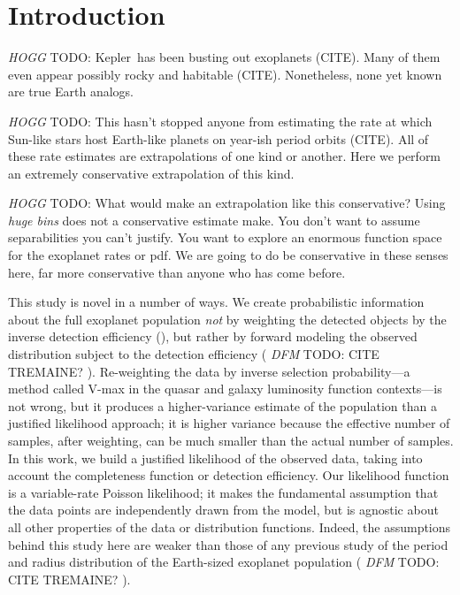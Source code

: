 \documentclass[12pt,preprint]{aastex}
\newcommand{\project}[1]{{\sffamily #1}}
\newcommand{\kepler}{\project{Kepler}}
\newcommand{\todo}[3]{{\color{#2} \emph{#1} TODO: #3}}
\newcommand{\dfmtodo}[1]{\todo{DFM}{red}{#1}}
\newcommand{\hoggtodo}[1]{\todo{HOGG}{blue}{#1}}
\begin{document}

\section{Introduction}

\hoggtodo{%
\kepler\ has been busting out exoplanets (CITE).
Many of them even appear possibly rocky and habitable (CITE).
Nonetheless, none yet known are true Earth analogs.
}

\hoggtodo{%
This hasn't stopped anyone from estimating the rate at which Sun-like stars
host Earth-like planets on year-ish period orbits (CITE).
All of these rate estimates are extrapolations of one kind or another.
Here we perform an extremely conservative extrapolation of this kind.
}

\hoggtodo{%
What would make an extrapolation like this conservative?
Using \emph{huge bins} does not a conservative estimate make.
You don't want to assume separabilities you can't justify.
You want to explore an enormous function space for the exoplanet rates or pdf.
We are going to do be conservative in these senses here, far more conservative
than anyone who has come before.
}

This study is novel in a number of ways.
We create probabilistic information about the full exoplanet population
\emph{not} by weighting the detected objects by the inverse detection
efficiency (\citealt{petigura}), but rather by forward modeling the
observed distribution subject to the detection efficiency
(\dfmtodo{CITE TREMAINE?} \citealt{dong}).
Re-weighting the data by inverse selection probability---a method called
V-max in the quasar and galaxy luminosity function contexts---is not wrong,
but it produces a higher-variance estimate of the population than a justified
likelihood approach; it is higher variance because
the effective number of samples, after
weighting, can be much smaller than the actual number of samples.
In this work, we build a justified
likelihood of the observed data, taking into account the completeness function
or detection efficiency.
Our likelihood function is a variable-rate Poisson likelihood; it makes the
fundamental assumption that the data points are independently drawn from the
model, but is agnostic about all other properties of the data or distribution
functions.
Indeed, the assumptions behind this study here are weaker than those of any
previous study of the period and radius distribution of the Earth-sized
exoplanet population (\dfmtodo{CITE TREMAINE?} \citealt{dong, petigura}).
\end{document}
